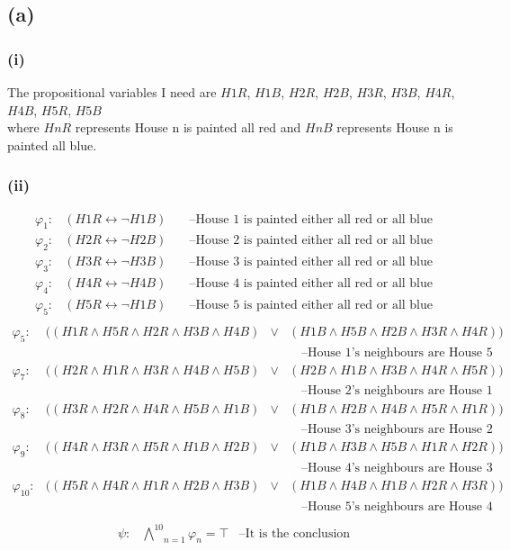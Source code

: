 \documentclass{article} %
\begin{document}
\subsection*{(a)}
\subsubsection*{(i)}
The propositional variables I need are $H1R$, $H1B$, $H2R$, $H2B$, $H3R$, $H3B$, $H4R$, $H4B$, $H5R$, $H5B$\\
where $HnR$ represents House n is painted all red and $HnB$ represents House n is painted all blue. 
\subsubsection*{(ii)}
\[\begin{array}{rrl}
    \varphi_1:&(H1R \leftrightarrow \neg H1B)&\quad\mbox{--House 1 is painted either all red or all blue}\\
    \varphi_2:&(H2R \leftrightarrow \neg H2B)&\quad\mbox{--House 2 is painted either all red or all blue}\\
    \varphi_3:&(H3R \leftrightarrow \neg H3B)&\quad\mbox{--House 3 is painted either all red or all blue}\\
    \varphi_4:&(H4R \leftrightarrow \neg H4B)&\quad\mbox{--House 4 is painted either all red or all blue}\\
    \varphi_5:&(H5R \leftrightarrow \neg H1B)&\quad\mbox{--House 5 is painted either all red or all blue}\\
\end{array}\]
\[\begin{array}{rrcl}
    \varphi_5:&((H1R \wedge H5R \wedge H2R \wedge H3B \wedge H4B)&\vee&(H1B \wedge H5B \wedge H2B \wedge H3R \wedge H4R))\\
    &&&\quad\mbox{--House 1’s neighbours are House 5 and House 2}\\
    \varphi_7:&((H2R \wedge H1R \wedge H3R \wedge H4B \wedge H5B)&\vee&(H2B \wedge H1B \wedge H3B \wedge H4R \wedge H5R))\\
    &&&\quad\mbox{--House 2’s neighbours are House 1 and House 3}\\
    \varphi_8:&((H3R \wedge H2R \wedge H4R \wedge H5B \wedge H1B)&\vee&(H1B \wedge H2B \wedge H4B \wedge H5R \wedge H1R))\\
    &&&\quad\mbox{--House 3’s neighbours are House 2 and House 4}\\
    \varphi_9:&((H4R \wedge H3R \wedge H5R \wedge H1B \wedge H2B)&\vee&(H1B \wedge H3B \wedge H5B \wedge H1R \wedge H2R))\\
    &&&\quad\mbox{--House 4’s neighbours are House 3 and House 5}\\
    \varphi_{10}:&((H5R \wedge H4R \wedge H1R \wedge H2B \wedge H3B)&\vee&(H1B \wedge H4B \wedge H1B \wedge H2R \wedge H3R))\\
    &&&\quad\mbox{--House 5’s neighbours are House 4 and House 1}\\
\end{array}\]
\[\begin{array}{rcll}
\psi:&\underset{n = 1}{\overset{10}{\bigwedge}} \varphi_n = \top&\mbox{--It is the conclusion}\\
\end{array}\]
\end{document}

